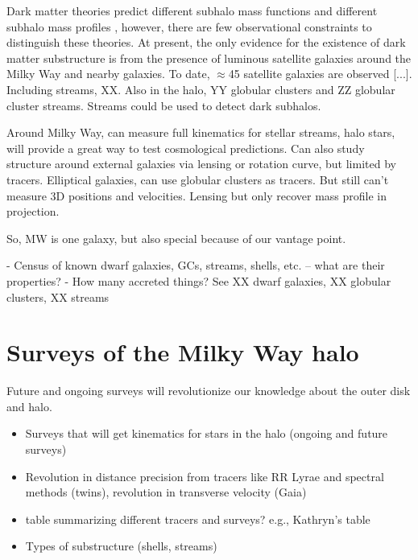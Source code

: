 Dark matter theories predict different subhalo mass functions and different subhalo mass profiles \citep{peter13, todo, WDM, CDM, SIDM}, however, there are few observational constraints to distinguish these theories. At present, the only evidence for the existence of dark matter substructure is from the presence of luminous satellite galaxies around the Milky Way and nearby galaxies. To date, $\approx$45 satellite galaxies are observed [...]. Including streams, XX. Also in the halo, YY globular clusters and ZZ globular cluster streams. Streams could be used to detect dark subhalos. 

Around Milky Way, can measure full kinematics for stellar streams, halo stars, will provide a great way to test cosmological predictions. Can also study structure around external galaxies via lensing or rotation curve, but limited by tracers. Elliptical galaxies, can use globular clusters as tracers. But still can't measure 3D positions and velocities. Lensing but only recover mass profile in projection. 

So, MW is one galaxy, but also special because of our vantage point.

- Census of known dwarf galaxies, GCs, streams, shells, etc. -- what are their properties?
- How many accreted things? See XX dwarf galaxies, XX globular clusters, XX streams

\section{Surveys of the Milky Way halo}\label{sec:surveys}

Future and ongoing surveys will revolutionize our knowledge about the outer disk and halo.

\begin{itemize}
	\item Surveys that will get kinematics for stars in the halo (ongoing and future surveys)
	\item Revolution in distance precision from tracers like RR Lyrae and spectral methods (twins), revolution in transverse velocity (Gaia)
	\item table summarizing different tracers and surveys? e.g., Kathryn's table
	\item Types of substructure (shells, streams)
\end{itemize}


